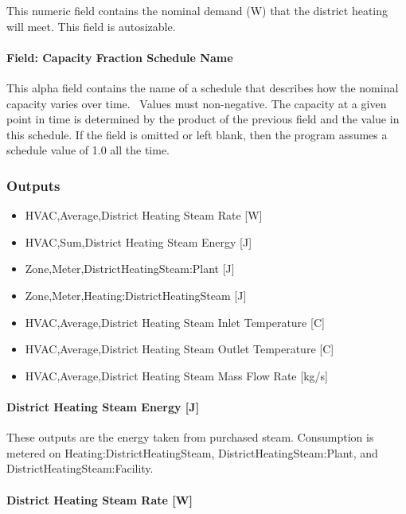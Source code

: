 This numeric field contains the nominal demand (W) that the district heating will meet. This field is autosizable.

\paragraph{Field: Capacity Fraction Schedule Name}\label{field-capacity-fraction-schedule-name-2}

This alpha field contains the name of a schedule that describes how the nominal capacity varies over time.~ Values must non-negative. The capacity at a given point in time is determined by the product of the previous field and the value in this schedule. If the field is omitted or left blank, then the program assumes a schedule value of 1.0 all the time.

\subsubsection{Outputs}\label{outputs-15-003}

\begin{itemize}
    \item
    HVAC,Average,District Heating Steam Rate {[}W{]}
    \item
    HVAC,Sum,District Heating Steam Energy {[}J{]}
    \item
    Zone,Meter,DistrictHeatingSteam:Plant {[}J{]}
    \item
    Zone,Meter,Heating:DistrictHeatingSteam {[}J{]}
    \item
    HVAC,Average,District Heating Steam Inlet Temperature {[}C{]}
    \item
    HVAC,Average,District Heating Steam Outlet Temperature {[}C{]}
    \item
    HVAC,Average,District Heating Steam Mass Flow Rate {[}kg/s{]}
\end{itemize}

\paragraph{District Heating Steam Energy {[}J{]}}\label{district-heating-Steam-energy-j}

These outputs are the energy taken from purchased steam. Consumption is metered on Heating:DistrictHeatingSteam, DistrictHeatingSteam:Plant, and DistrictHeatingSteam:Facility.

\paragraph{District Heating Steam Rate {[}W{]}}\label{district-heating-steam-rate-w}

